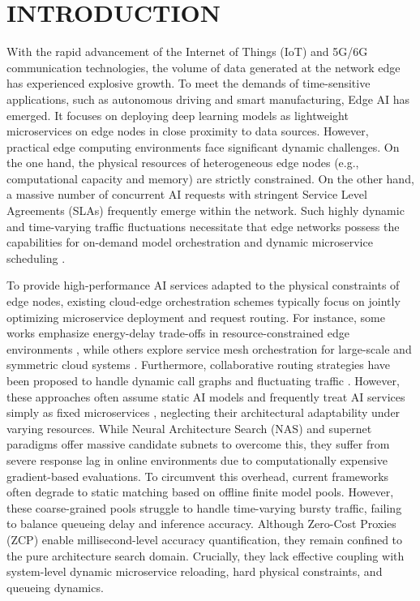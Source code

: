 \documentclass[conference]{IEEEtran}
\begin{document}
\section{INTRODUCTION}
With the rapid advancement of the Internet of Things (IoT) and 5G/6G communication technologies, the volume of data generated at the network edge has experienced explosive growth. To meet the demands of time-sensitive applications, such as autonomous driving and smart manufacturing, Edge AI \cite{edgeai, smarteredge} has emerged. It focuses on deploying deep learning models as lightweight microservices on edge nodes in close proximity to data sources. However, practical edge computing environments face significant dynamic challenges. On the one hand, the physical resources of heterogeneous edge nodes (e.g., computational capacity and memory) are strictly constrained. On the other hand, a massive number of concurrent AI requests with stringent Service Level Agreements (SLAs) frequently emerge within the network. Such highly dynamic and time-varying traffic fluctuations necessitate that edge networks possess the capabilities for on-demand model orchestration and dynamic microservice scheduling \cite{Time-Varying, peng2026collaborative}.

To provide high-performance AI services adapted to the physical constraints of edge nodes, existing cloud-edge orchestration schemes typically focus on jointly optimizing microservice deployment and request routing. For instance, some works emphasize energy-delay trade-offs in resource-constrained edge environments \cite{Energy-Delay-Aware, Energy-Aware}, while others explore service mesh orchestration for large-scale and symmetric cloud systems \cite{Large-Scale, Symmetric}. Furthermore, collaborative routing strategies have been proposed to handle dynamic call graphs and fluctuating traffic \cite{Collaborative}. However, these approaches often assume static AI models and frequently treat AI services simply as fixed microservices \cite{Hybrid}, neglecting their architectural adaptability under varying resources. While Neural Architecture Search (NAS) \cite{NASsurvey} and supernet paradigms \cite{OFA, slimmable} offer massive candidate subnets to overcome this, they suffer from severe response lag in online environments due to computationally expensive gradient-based evaluations. To circumvent this overhead, current frameworks often degrade to static matching based on offline finite model pools. However, these coarse-grained pools struggle to handle time-varying bursty traffic, failing to balance queueing delay and inference accuracy. Although Zero-Cost Proxies (ZCP) \cite{ZCP, GSTC} enable millisecond-level accuracy quantification, they remain confined to the pure architecture search domain. Crucially, they lack effective coupling with system-level dynamic microservice reloading, hard physical constraints, and queueing dynamics.
\end{document}
